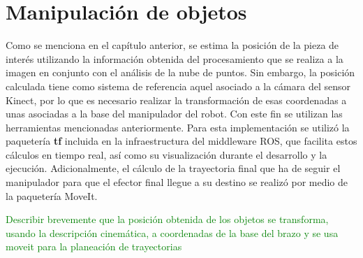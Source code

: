 \section{Manipulación de objetos}

Como se menciona en el capítulo anterior, se estima la posición de la pieza de interés utilizando la información obtenida del procesamiento que se realiza a la imagen en conjunto con el análisis de la nube de puntos. Sin embargo, la posición calculada tiene como sistema de referencia aquel asociado a la cámara del sensor Kinect, por lo que es necesario realizar la transformación de esas coordenadas a unas asociadas a la base del manipulador del robot. Con este fin se utilizan las herramientas mencionadas anteriormente. Para esta implementación se utilizó la paquetería \textbf{tf}\cite{tf_ROS} incluida en la infraestructura del middleware ROS, que facilita estos cálculos en tiempo real, así como su visualización durante el desarrollo y la ejecución. Adicionalmente, el cálculo de la trayectoria final que ha de seguir el manipulador para que el efector final llegue a su destino se realizó por medio de la paquetería MoveIt.

\textcolor{green}{Describir brevemente que la posición obtenida de los objetos se transforma, usando la descripción cinemática, a coordenadas de la base del brazo y se usa moveit para la planeación de trayectorias}


